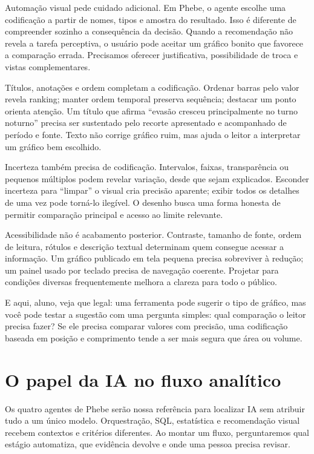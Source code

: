 Automação visual pede cuidado adicional. Em Phebe, o agente escolhe uma codificação a partir de nomes, tipos e amostra do resultado. Isso é diferente de compreender sozinho a consequência da decisão. Quando a recomendação não revela a tarefa perceptiva, o usuário pode aceitar um gráfico bonito que favorece a comparação errada. Precisamos oferecer justificativa, possibilidade de troca e vistas complementares.

Títulos, anotações e ordem completam a codificação. Ordenar barras pelo valor revela ranking; manter ordem temporal preserva sequência; destacar um ponto orienta atenção. Um título que afirma ``evasão cresceu principalmente no turno noturno'' precisa ser sustentado pelo recorte apresentado e acompanhado de período e fonte. Texto não corrige gráfico ruim, mas ajuda o leitor a interpretar um gráfico bem escolhido.

Incerteza também precisa de codificação. Intervalos, faixas, transparência ou pequenos múltiplos podem revelar variação, desde que sejam explicados. Esconder incerteza para ``limpar'' o visual cria precisão aparente; exibir todos os detalhes de uma vez pode torná-lo ilegível. O desenho busca uma forma honesta de permitir comparação principal e acesso ao limite relevante.

Acessibilidade não é acabamento posterior. Contraste, tamanho de fonte, ordem de leitura, rótulos e descrição textual determinam quem consegue acessar a informação. Um gráfico publicado em tela pequena precisa sobreviver à redução; um painel usado por teclado precisa de navegação coerente. Projetar para condições diversas frequentemente melhora a clareza para todo o público.

\begin{GuidedBox}
E aqui, aluno, veja que legal: uma ferramenta pode sugerir o tipo de gráfico, mas você pode testar a sugestão com uma pergunta simples: qual comparação o leitor precisa fazer? Se ele precisa comparar valores com precisão, uma codificação baseada em posição e comprimento tende a ser mais segura que área ou volume.
\end{GuidedBox}

\section{O papel da IA no fluxo analítico}

Os quatro agentes de Phebe serão nossa referência para localizar IA sem atribuir tudo a um único modelo. Orquestração, SQL, estatística e recomendação visual recebem contextos e critérios diferentes. Ao montar um fluxo, perguntaremos qual estágio automatiza, que evidência devolve e onde uma pessoa precisa revisar.

